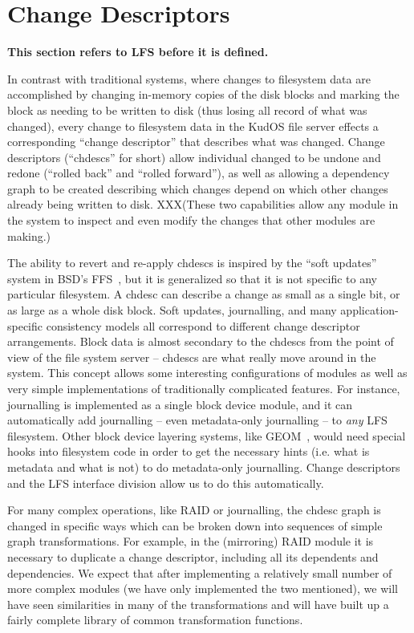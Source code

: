 \preparagraphspacing{}
\section*{Change Descriptors}
\label{sec:chdescs}

{\bf This section refers to LFS before it is defined.}

In contrast with traditional systems, where changes to filesystem data
are accomplished by changing in-memory copies of the disk blocks and
marking the block as needing to be written to disk (thus losing all
record of what was changed), every change to filesystem data in the
KudOS file server effects a corresponding ``change descriptor'' that
describes what was changed. Change descriptors (``chdescs'' for short)
allow individual changed to be undone and redone (``rolled back'' and
``rolled forward''), as well as allowing a dependency graph to be
created describing which changes depend on which other changes already
being written to disk. XXX(These two capabilities allow any module in
the system to inspect and even modify the changes that other modules
are making.)

The ability to revert and re-apply chdescs is inspired by the ``soft updates''
system in BSD's FFS~\cite{ganger00soft}, but it is generalized so that it is not
specific to any particular filesystem. A chdesc can describe a change as small
as a single bit, or as large as a whole disk block. Soft updates, journalling,
and many application-specific consistency models all correspond to different
change descriptor arrangements. Block data is almost secondary to the chdescs
from the point of view of the file system server -- chdescs are what really move
around in the system. This concept allows some interesting configurations of
modules as well as very simple implementations of traditionally complicated
features. For instance, journalling is implemented as a single block device
module, and it can automatically add journalling -- even metadata-only
journalling -- to {\it any} LFS filesystem. Other block device layering systems,
like GEOM~\cite{geom}, would need special hooks into filesystem code in order to
get the necessary hints (i.e. what is metadata and what is not) to do
metadata-only journalling. Change descriptors and the LFS interface division
allow us to do this automatically.

For many complex operations, like RAID or journalling, the chdesc graph is
changed in specific ways which can be broken down into sequences of simple graph
transformations. For example, in the (mirroring) RAID module it is necessary to
duplicate a change descriptor, including all its dependents and dependencies. We
expect that after implementing a relatively small number of more complex modules
(we have only implemented the two mentioned), we will have seen similarities in
many of the transformations and will have built up a fairly complete library of
common transformation functions.

